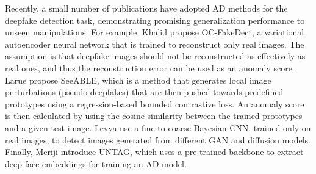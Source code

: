 Recently, a small number of publications have adopted AD methods for the deepfake detection task, demonstrating promising generalization performance to unseen manipulations. For example, Khalid \etal \cite{khalid2020ocfakedect} propose OC-FakeDect, a variational autoencoder neural network that is trained to reconstruct only real images. The assumption is that deepfake images should not be reconstructed as effectively as real ones, and thus the reconstruction error can be used as an anomaly score. Larue \etal \cite{larue2023seeable} propose  SeeABLE, which is a method that generates local image perturbations (pseudo-deepfakes) that are then pushed towards predefined prototypes using a regression-based bounded contrastive loss. An anomaly score is then calculated by using the cosine similarity between the trained prototypes and a given test image. Levya \etal \cite{leyva2024data} use a fine-to-coarse Bayesian CNN, trained only on real images, to detect images generated from different GAN and diffusion models. Finally, Meriji \etal \cite{mejri2023untag} introduce UNTAG, which uses a pre-trained backbone to extract deep face embeddings for training an AD model.